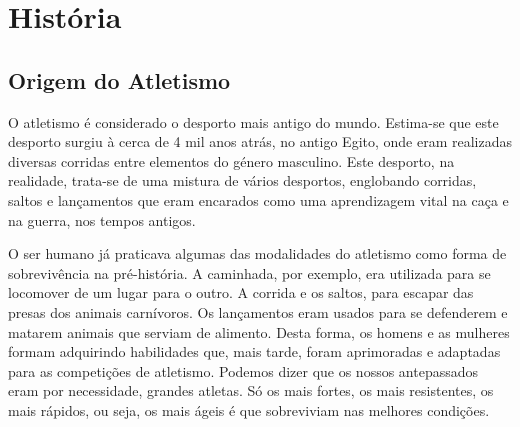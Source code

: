 \documentclass{report}
\begin{document}
\chapter{História}
\label{chap.História}
    
    \section{Origem do Atletismo }
    O atletismo é considerado o desporto mais antigo do mundo. Estima-se que este desporto surgiu à cerca de 4 mil anos atrás, no antigo Egito, onde eram realizadas diversas corridas entre elementos do género masculino. 
    Este desporto, na realidade, trata-se de uma mistura de vários desportos, englobando corridas, saltos e lançamentos que eram encarados como uma aprendizagem vital na caça e na guerra, nos tempos antigos. \par
    O ser humano já praticava algumas das modalidades do atletismo como forma de sobrevivência na pré-história. A caminhada, por exemplo, era utilizada para se locomover de um lugar para o outro. A corrida e os saltos, para escapar das presas dos animais carnívoros. Os lançamentos eram usados para se defenderem e matarem animais que serviam de alimento. Desta forma, os homens e as mulheres formam adquirindo habilidades que, mais tarde, foram aprimoradas e adaptadas para as competições de atletismo. Podemos dizer que os nossos antepassados eram por necessidade, grandes atletas. Só os mais fortes, os mais resistentes, os mais rápidos, ou seja, os mais ágeis é que sobreviviam nas melhores condições. \cite{origemdoatletismo}
   
\end{document}
